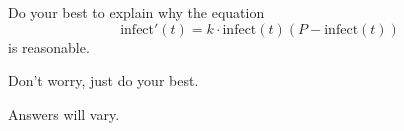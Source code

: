 \documentclass{ximera}
\begin{document}
\begin{problem}
  Do your best to explain why the equation
  \[
  \mathrm{infect}'(t) = k\cdot \mathrm{infect}(t)(P-\mathrm{infect}(t))
  \]
  is reasonable.
  \begin{hint}
    Don't worry, just do your best.
  \end{hint}
  \begin{freeResponse}
    Answers will vary.
  \end{freeResponse}
\end{problem}






\end{document}
